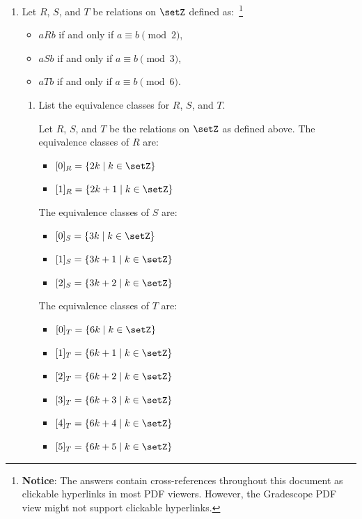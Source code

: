 \begin{enumerate}
  \newpage
  \item Let $R$, $S$, and $T$ be relations on $\setZ$ defined as:~\footnote{
    \textbf{Notice}: The answers contain cross-references throughout this document as clickable hyperlinks in most PDF viewers. 
    However, the Gradescope PDF view might not support clickable hyperlinks.
  }
  \begin{itemize}
    \item $a R b$ if and only if $a \equiv b \pmod{2}$,
    \item $a S b$ if and only if $a \equiv b \pmod{3}$,
    \item $a T b$ if and only if $a \equiv b \pmod{6}$.
  \end{itemize}
  \begin{enumerate}
    \item List the equivalence classes for $R$, $S$, and $T$.
      \begin{subanswer}
        Let $R$, $S$, and $T$ be the relations on $\setZ$ as defined above. The equivalence classes of $R$ are:
          \begin{itemize}
            \item $[0]_R = \{2k \mid k \in \setZ\}$
            \item $[1]_R = \{2k+1 \mid k \in \setZ\}$
          \end{itemize}
          The equivalence classes of $S$ are:
          \begin{itemize}
            \item $[0]_S = \{3k \mid k \in \setZ\}$
            \item $[1]_S = \{3k+1 \mid k \in \setZ\}$
            \item $[2]_S = \{3k+2 \mid k \in \setZ\}$
          \end{itemize}
          The equivalence classes of $T$ are:
          \begin{itemize}
            \item $[0]_T = \{6k \mid k \in \setZ\}$
            \item $[1]_T = \{6k+1 \mid k \in \setZ\}$
            \item $[2]_T = \{6k+2 \mid k \in \setZ\}$
            \item $[3]_T = \{6k+3 \mid k \in \setZ\}$
            \item $[4]_T = \{6k+4 \mid k \in \setZ\}$
            \item $[5]_T = \{6k+5 \mid k \in \setZ\}$
          \end{itemize}
      \end{subanswer}

\end{enumerate}
\end{enumerate}

